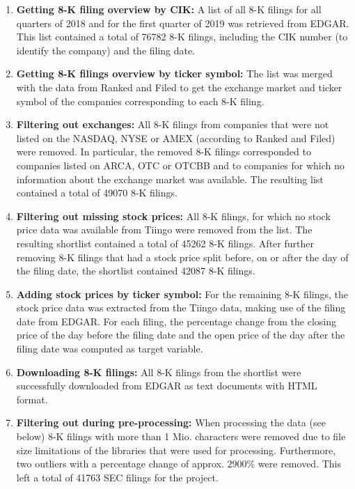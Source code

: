 \documentclass{article}
\begin{document}
	\begin{enumerate}
		\item \textbf{Getting 8-K filing overview by CIK:} A list of all 8-K filings for all quarters of 2018 and for the first quarter of 2019 was retrieved from EDGAR. This list contained a total of 76782 8-K filings, including the CIK number (to identify the company) and the filing date.
		\item \textbf{Getting 8-K filings overview by ticker symbol:} The list was merged with the data from Ranked and Filed to get the exchange market and ticker symbol of the companies corresponding to each 8-K filing.
		\item \textbf{Filtering out exchanges:} All  8-K filings from companies that were not listed on the NASDAQ, NYSE or AMEX (according to Ranked and Filed) were removed. In particular, the removed 8-K filings corresponded to companies listed on ARCA, OTC or OTCBB and to companies for which no information about the exchange market was available. The resulting list contained a total of 49070 8-K filings.
		\item \textbf{Filtering out missing stock prices:} All 8-K filings, for which no stock price data was available from Tiingo were removed from the list. The resulting shortlist contained a total of 45262 8-K filings. After further removing 8-K filings that had a stock price split before, on or after the day of the filing date, the shortlist contained 42087  8-K filings.
		\item \textbf{Adding stock prices by ticker symbol:} For the remaining 8-K filings, the stock price data was extracted from the Tiingo data, making use of the filing date from EDGAR. For each filing, the percentage change from the closing price of the day before the filing date and the open price of the day after the filing date was computed as target variable.
		\item \textbf{Downloading 8-K filings:} All 8-K filings from the shortlist were successfully downloaded from EDGAR as text documents with HTML format.
		\item \textbf{Filtering out during pre-processing:} When processing the data (see below) 8-K filings with more than 1 Mio. characters were removed due to file size limitations of the libraries that were used for processing. Furthermore, two outliers with a percentage change of approx. $2900$\% were removed. This left a total of 41763 SEC filings for the project.

		
	\end{enumerate}
	
\end{document}
